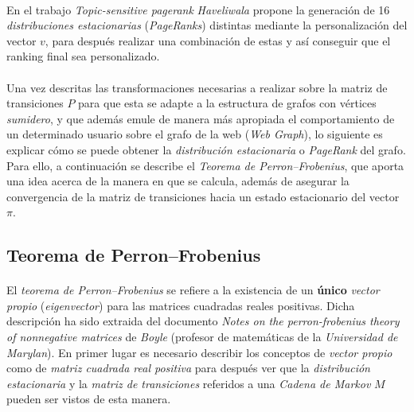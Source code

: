 \documentclass{subfiles}
\begin{document}
      \paragraph{}
      En el trabajo \emph{Topic-sensitive pagerank} \cite{haveliwala2002topic} \emph{Haveliwala} propone la generación de 16 \emph{distribuciones estacionarias} (\emph{PageRanks}) distintas mediante la personalización del vector $v$, para después realizar una combinación de estas y así conseguir que el ranking final sea personalizado.

      \paragraph{}
      Una vez descritas las transformaciones necesarias a realizar sobre la matriz de transiciones $P$ para que esta se adapte a la estructura de grafos con vértices \emph{sumidero}, y que además emule de manera más apropiada el comportamiento de un determinado usuario sobre el grafo de la web (\emph{Web Graph}), lo siguiente es explicar cómo se puede obtener la \emph{distribución estacionaria} o \emph{PageRank} del grafo. Para ello, a continuación se describe el \emph{Teorema de Perron–Frobenius}, que aporta una idea acerca de la manera en que se calcula, además de asegurar la convergencia de la matriz de transiciones hacia un estado estacionario del vector $\pi$.

      \subsection{Teorema de Perron–Frobenius}
      \label{sec:perron_frobenius_theorem}

        \paragraph{}
        El \emph{teorema de Perron–Frobenius} se refiere a la existencia de un \textbf{único} \emph{vector propio} (\emph{eigenvector}) para las matrices cuadradas reales positivas. Dicha descripción ha sido extraida del documento \emph{Notes on the perron-frobenius theory of nonnegative matrices} \cite{boyle2005notes} de \emph{Boyle} (profesor de matemáticas de la \emph{Universidad de Marylan}). En primer lugar es necesario describir los conceptos de \emph{vector propio} como de \emph{matriz cuadrada real positiva} para después ver que la \emph{distribución estacionaria} y la \emph{matriz de transiciones} referidos a una \emph{Cadena de Markov} $M$ pueden ser vistos de esta manera.
\end{document}

